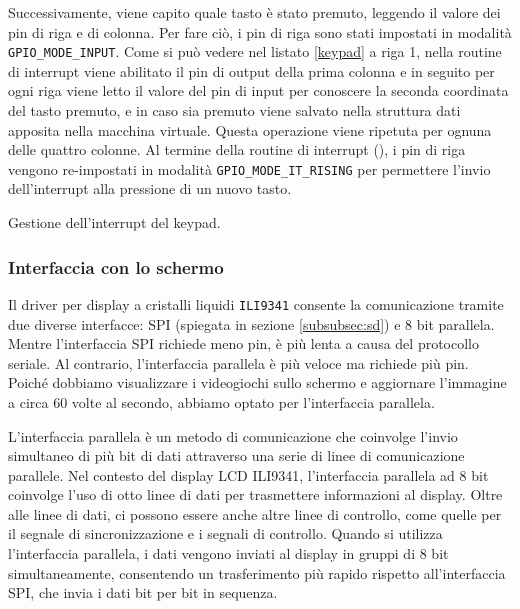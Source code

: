 \documentclass[a4paper]{article}
\begin{document}
Successivamente, viene capito quale tasto è stato premuto, leggendo il valore dei pin
di riga e di colonna. Per fare ciò, i pin di riga sono stati impostati in modalità
\texttt{GPIO\_MODE\_INPUT}. Come si può vedere nel listato \ref{keypad} a riga 1,
nella routine di interrupt viene abilitato il pin di output della prima colonna e in seguito
per ogni riga viene letto il valore del pin di input per conoscere la seconda coordinata
del tasto premuto, e in caso sia premuto viene salvato nella struttura dati apposita
nella macchina virtuale. Questa operazione viene ripetuta per ognuna delle quattro colonne.
Al termine della routine di interrupt
({}),
i pin di riga vengono re-impostati in modalità \texttt{GPIO\_MODE\_IT\_RISING} per permettere
l'invio dell'interrupt alla pressione di un nuovo tasto.

\begin{Listing}[h!t] %
    \centering
    \caption{Gestione dell'interrupt del keypad.}
    \label{keypad}
\end{Listing}

\subsubsection{Interfaccia con lo schermo}

Il driver per display a cristalli liquidi \texttt{ILI9341} consente la comunicazione tramite due
diverse interfacce: SPI (spiegata in sezione \ref{subsubsec:sd}) e 8 bit parallela. Mentre
l'interfaccia SPI richiede meno pin, è più lenta a causa del protocollo seriale. Al contrario,
l'interfaccia parallela è più veloce ma richiede più pin. Poiché dobbiamo visualizzare
i videogiochi sullo schermo e aggiornare l'immagine a circa 60 volte al secondo, abbiamo
optato per l'interfaccia parallela.

L'interfaccia parallela è un metodo di comunicazione che coinvolge l'invio simultaneo di più
bit di dati attraverso una serie di linee di comunicazione parallele. Nel contesto del display
LCD ILI9341, l'interfaccia parallela ad 8 bit coinvolge l'uso di otto linee di dati per
trasmettere informazioni al display. Oltre alle linee di dati, ci possono essere anche altre
linee di controllo, come quelle per il segnale di sincronizzazione e i segnali di controllo.
Quando si utilizza l'interfaccia parallela, i dati vengono inviati al display in gruppi di 8 bit
simultaneamente, consentendo un trasferimento più rapido rispetto all'interfaccia SPI,
che invia i dati bit per bit in sequenza.
\end{document}
